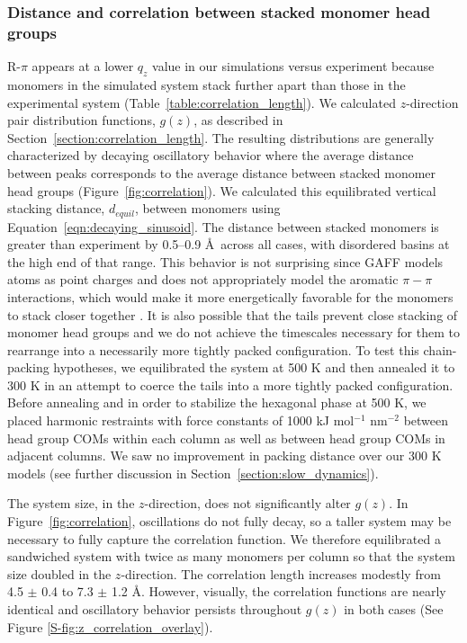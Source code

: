 \documentclass[journal=jpcbfk,manuscript=article]{achemso}
\begin{document}
  \subsubsection*{Distance and correlation between stacked monomer head groups}

  R-$\pi$ appears at a lower $q_z$ value in our simulations versus experiment
  because monomers in the simulated system stack further apart than those in the
  experimental system (Table~\ref{table:correlation_length}). We calculated
  $z$-direction pair distribution functions, $g(z)$, as described in
  Section~\ref{section:correlation_length}.  The resulting distributions are
  generally characterized by decaying oscillatory behavior where the average
  distance between peaks corresponds to the average distance between stacked
  monomer head groups (Figure~\ref{fig:correlation}).  We calculated this
  equilibrated vertical stacking distance, $\mathit{d}_{equil}$, between monomers
  using Equation~\ref{eqn:decaying_sinusoid}. The distance between stacked
  monomers is greater than experiment by 0.5--0.9 \AA~across all cases, with
  disordered basins at the high end of that range. This behavior is not
  surprising since GAFF models atoms as point charges and does not appropriately
  model the aromatic $\pi-\pi$ interactions, which would make it more
  energetically favorable for the monomers to stack closer together
  \cite{wang_development_2004}. It is also possible that the tails prevent
  close stacking of monomer head groups and we do not achieve the timescales
  necessary for them to rearrange into a necessarily more tightly packed
  configuration. To test this chain-packing hypotheses, we equilibrated the
  system at 500 K and then annealed it to 300 K in an attempt to coerce the tails
  into a more tightly packed configuration. Before annealing and in order to
  stabilize the hexagonal phase at 500 K, we placed harmonic restraints with
  force constants of 1000 kJ mol$^{-1}$ nm$^{-2}$ between head group COMs within
  each column as well as between head group COMs in adjacent columns. We saw no
  improvement in packing distance over our 300 K models (see further discussion
  in Section~\ref{section:slow_dynamics}). 
  
  The system size, in the $z$-direction, does not significantly alter $g(z)$.
  In Figure~\ref{fig:correlation}, oscillations do not fully decay, so a taller
  system may be necessary to fully capture the correlation function. We therefore
  equilibrated a sandwiched system with twice as many monomers per column so that
  the system size doubled in the $z$-direction. The correlation length increases
  modestly from 4.5 $\pm$ 0.4 to 7.3 $\pm$ 1.2 \AA. However, visually, the
  correlation functions are nearly identical and oscillatory behavior persists
  throughout $g(z)$ in both cases (See
  Figure \ref{S-fig:z_correlation_overlay}).
\end{document}
